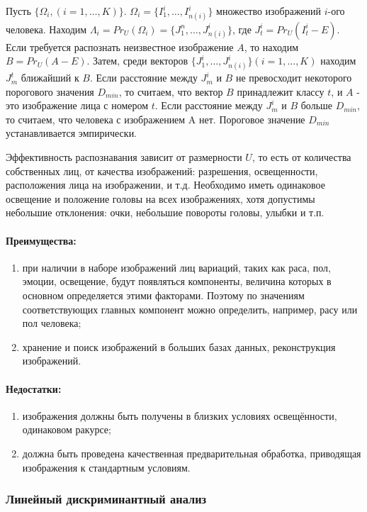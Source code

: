 \documentclass[a4paper,12pt]{report}
\numberwithin{equation}{section}
\begin{document}
Пусть $\{\Omega_i, (i=1,\dots,K)\}$. $\Omega_i = \{I_1^i,\dots,I_{n(i)}^i\}$
множество изображений $i$-ого человека. Находим $\Lambda_i = Pr_U(\Omega_i) =
\{J_1^n,\dots,J_{n(i)}^i\}$, где $J_t^i = Pr_U(I_t^i - E)$. Если требуется
распознать неизвестное изображение $A$, то находим $B = Pr_U(A - E)$. Затем,
среди векторов $\{J_1^i,\dots,J_{n(i)}^i\} (i=1,\dots,K)$ находим $J_m^t$
ближайший к $B$. Если расстояние между $J_m^i$ и $B$ не превосходит некоторого
порогового значения $D_{min}$, то считаем, что вектор $B$ принадлежит классу
$t$, и $A$ - это изображение лица с номером $t$. Если расстояние между $J_m^i$ и
$B$ больше $D_{min}$, то считаем, что человека с изображением A нет. Пороговое
значение $D_{min}$ устанавливается эмпирически.


Эффективность распознавания зависит от размерности $U$, то есть от количества
собственных лиц, от качества изображений: разрешения, освещенности, расположения
лица на изображении, и т.д. Необходимо иметь одинаковое освещение и положение
головы на всех изображениях, хотя допустимы небольшие отклонения: очки, небольшие
повороты головы, улыбки и т.п.

\paragraph{Преимущества:}
\begin{enumerate}
\item при наличии в наборе изображений лиц вариаций, таких как раса, пол,
эмоции, освещение, будут появляться компоненты, величина которых в основном
определяется этими факторами. Поэтому по значениям соответствующих главных
компонент можно определить, например, расу или пол человека;
\item хранение и поиск изображений в больших базах данных, реконструкция
изображений.
\end{enumerate}

\paragraph{Недостатки:}
\begin{enumerate}
\item изображения должны быть получены в близких условиях освещённости,
одинаковом ракурсе;
\item должна быть проведена качественная предварительная
обработка, приводящая изображения к стандартным условиям.
\end{enumerate}
\subsubsection{Линейный дискриминантный анализ}
\end{document}

